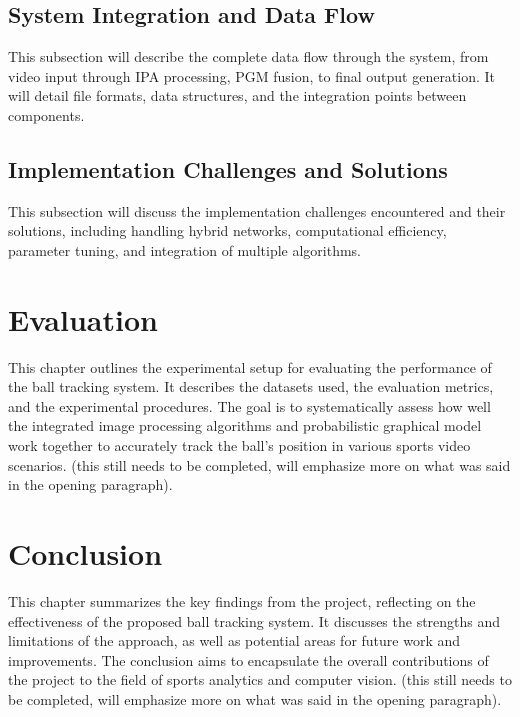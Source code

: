\documentclass[12pt,a4paper]{article}
\begin{document}
\subsection{System Integration and Data Flow}
This subsection will describe the complete data flow through the system, from video input through IPA processing, PGM fusion, to final output generation. It will detail file formats, data structures, and the integration points between components.

\subsection{Implementation Challenges and Solutions}
This subsection will discuss the implementation challenges encountered and their solutions, including handling hybrid networks, computational efficiency, parameter tuning, and integration of multiple algorithms.

\newpage
\section{Evaluation}
This chapter outlines the experimental setup for evaluating the performance of the ball tracking system. It describes the datasets used, the evaluation metrics, and the experimental procedures. The goal is to systematically assess how well the integrated image processing algorithms and probabilistic graphical model work together to accurately track the ball's position in various sports video scenarios. (this still needs to be completed, will emphasize more on what was said in the opening paragraph).

\newpage
\section{Conclusion}
This chapter summarizes the key findings from the project, reflecting on the effectiveness of the proposed ball tracking system. It discusses the strengths and limitations of the approach, as well as potential areas for future work and improvements. The conclusion aims to encapsulate the overall contributions of the project to the field of sports analytics and computer vision. (this still needs to be completed, will emphasize more on what was said in the opening paragraph).

\newpage
\printbibliography
\end{document}
